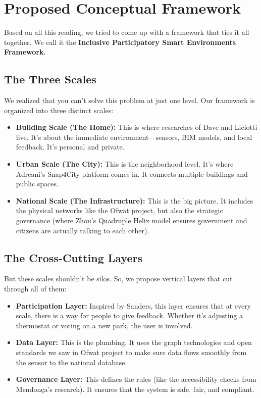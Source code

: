 \documentclass[a4paper,oneside,12pt]{report}
\begin{document}
\chapter{Proposed Conceptual Framework}

Based on all this reading, we tried to come up with a framework that ties it all together. We call it the \textbf{Inclusive Participatory Smart Environments Framework}.

\section{The Three Scales}
We realized that you can't solve this problem at just one level. Our framework is organized into three distinct scales:

\begin{itemize}
    \item \textbf{Building Scale (The Home):} This is where researches of Dave\cite{Dave2018} and Liciotti\cite{Liciotti2020} live. It's about the immediate environment—sensors, BIM models, and local feedback. It's personal and private.
    \item \textbf{Urban Scale (The City):} This is the neighborhood level. It's where Adreani\cite{Adreani2024}'s Snap4City platform comes in. It connects multiple buildings and public spaces.
    \item \textbf{National Scale (The Infrastructure):} This is the big picture. It includes the physical networks like the Ofwat project\cite{ThamesWater2024}, but also the strategic governance (where Zhou\cite{Zhou2024}'s Quadruple Helix model ensures government and citizens are actually talking to each other).
\end{itemize}

\section{The Cross-Cutting Layers}
But these scales shouldn't be silos. So, we propose vertical layers that cut through all of them:

\begin{itemize}
    \item \textbf{Participation Layer:} Inspired by Sanders\cite{Sanders2008}, this layer ensures that at every scale, there is a way for people to give feedback. Whether it's adjusting a thermostat or voting on a new park, the user is involved.
    \item \textbf{Data Layer:} This is the plumbing. It uses the graph technologies and open standards we saw in Ofwat project\cite{ThamesWater2024} to make sure data flows smoothly from the sensor to the national database.
    \item \textbf{Governance Layer:} This defines the rules (like the accessibility checks from Mendonça's research\cite{Mendonca2024}). It ensures that the system is safe, fair, and compliant.
\end{itemize}
\end{document}
